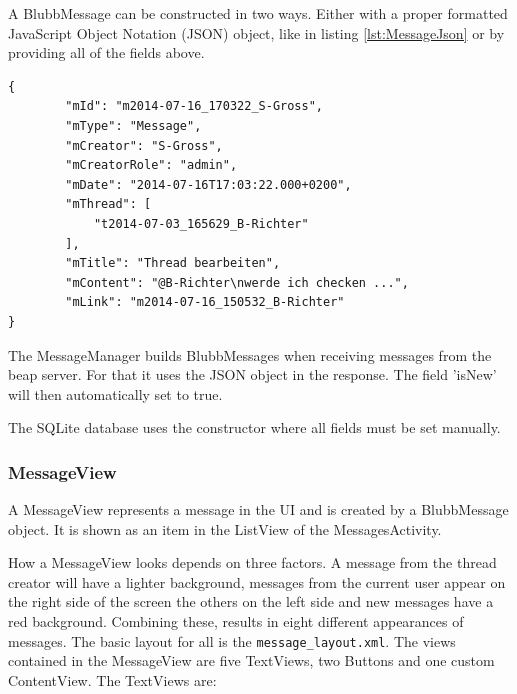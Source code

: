 \documentclass[12pt,a4paper,oneside]{report}
\newcommand{\beapServer}{beap server}
\newcommand{\code}[1]{\lstinline{#1}}
\begin{document}
A BlubbMessage can be constructed in two ways. Either with a proper formatted JavaScript Object Notation (JSON) object, like in listing \ref{lst:MessageJson} or by providing all of the fields above. 
\begin{lstlisting}[caption=JSON object received form \beapServer{}, label=lst:MessageJson]
{
        "mId": "m2014-07-16_170322_S-Gross",
        "mType": "Message",
        "mCreator": "S-Gross",
        "mCreatorRole": "admin",
        "mDate": "2014-07-16T17:03:22.000+0200",
        "mThread": [
            "t2014-07-03_165629_B-Richter"
        ],
        "mTitle": "Thread bearbeiten",
        "mContent": "@B-Richter\nwerde ich checken ...",
        "mLink": "m2014-07-16_150532_B-Richter"
}

\end{lstlisting}
The MessageManager builds BlubbMessages when receiving messages from the \beapServer{}. For that it uses the JSON object in the response. The field 'isNew' will then automatically set to true.


The SQLite database uses the constructor where all fields must be set manually. 

\subsubsection{MessageView}
A MessageView represents a message in the UI and is created by a BlubbMessage object. It is shown as an item in the ListView of the MessagesActivity.


How a MessageView looks depends on three factors. A message from the thread creator will have a lighter background, messages from the current user appear on the right side of the screen the others on the left side and new messages have a red background. Combining these, results in eight different appearances of messages.
The basic layout for all is the \code{message_layout.xml}. The views contained in the MessageView are five TextViews, two Buttons and one custom ContentView.
The TextViews are:
\end{document}
